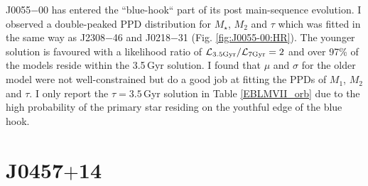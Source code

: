 J0055$-$00 has entered the ``blue-hook`` part of its post main-sequence evolution. I observed a double-peaked PPD distribution for $M_\star$, $M_2$ and $\tau$ which was fitted in the same way as J2308$-$46 and J0218$-$31 (Fig. \ref{fig:J0055-00:HR}). The younger solution is favoured with a likelihood ratio of $\mathcal{L}_{\rm 3.5 \rm Gyr} / \mathcal{L}_{\rm 7 \rm Gyr} = 2$ and over 97\% of the models reside within the 3.5\,Gyr solution. I found that $\mu$ and $\sigma$ for the older model were not well-constrained but do a good job at fitting the PPDs of  $M_1$, $M_2$ and $\tau$. I only report the $\tau=3.5$\,Gyr solution in Table \ref{EBLMVII_orb} due to the high probability of the primary star residing on the youthful edge of the blue hook. 






\section{J0457$+$14}

